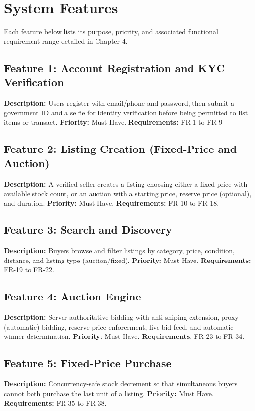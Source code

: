 \documentclass[11pt,a4paper]{report}
\begin{document}
\chapter{System Features}
Each feature below lists its purpose, priority, and associated functional requirement range detailed in Chapter 4.

\section{Feature 1: Account Registration and KYC Verification}
\textbf{Description:} Users register with email/phone and password, then submit a government ID and a selfie for identity verification before being permitted to list items or transact. \textbf{Priority:} Must Have. \textbf{Requirements:} FR-1 to FR-9.

\section{Feature 2: Listing Creation (Fixed-Price and Auction)}
\textbf{Description:} A verified seller creates a listing choosing either a fixed price with available stock count, or an auction with a starting price, reserve price (optional), and duration. \textbf{Priority:} Must Have. \textbf{Requirements:} FR-10 to FR-18.

\section{Feature 3: Search and Discovery}
\textbf{Description:} Buyers browse and filter listings by category, price, condition, distance, and listing type (auction/fixed). \textbf{Priority:} Must Have. \textbf{Requirements:} FR-19 to FR-22.

\section{Feature 4: Auction Engine}
\textbf{Description:} Server-authoritative bidding with anti-sniping extension, proxy (automatic) bidding, reserve price enforcement, live bid feed, and automatic winner determination. \textbf{Priority:} Must Have. \textbf{Requirements:} FR-23 to FR-34.

\section{Feature 5: Fixed-Price Purchase}
\textbf{Description:} Concurrency-safe stock decrement so that simultaneous buyers cannot both purchase the last unit of a listing. \textbf{Priority:} Must Have. \textbf{Requirements:} FR-35 to FR-38.
\end{document}
